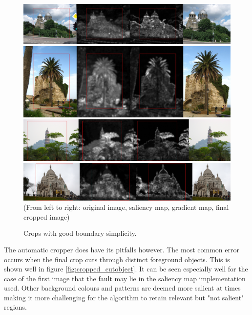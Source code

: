 \begin{figure}
\centering\includegraphics[width=0.9\columnwidth]{../figures/Chen_crops/simple_boundary/1022974255_Large.jpg}
\vskip3pt
\centering\includegraphics[width=0.9\columnwidth]{../figures/Chen_crops/simple_boundary/1192872104_Large.jpg}
\vskip3pt
\centering\includegraphics[width=0.9\columnwidth]{../figures/Chen_crops/simple_boundary/504325680_Large.jpg}
\vskip3pt
\centering\includegraphics[width=0.9\columnwidth]{../figures/Chen_crops/simple_boundary/6853433974_Large.jpg}
\vskip3pt
\small{(From left to right: original image, saliency map, gradient map, final cropped image)}
\caption{Crops with good boundary simplicity.\label{fig:cropped_simplicity}}
\end{figure}

The automatic cropper does have its pitfalls however.
The most common error occurs when the final crop cuts through distinct
foreground objects.
This is shown well in figure \ref{fig:cropped_cutobject}.
It can be seen especially well for the case of the first image that the fault
may lie in the saliency map implementation used.
Other background colours and patterns are deemed more salient at times making
it more challenging for the algorithm to retain relevant but "not salient"
regions.

